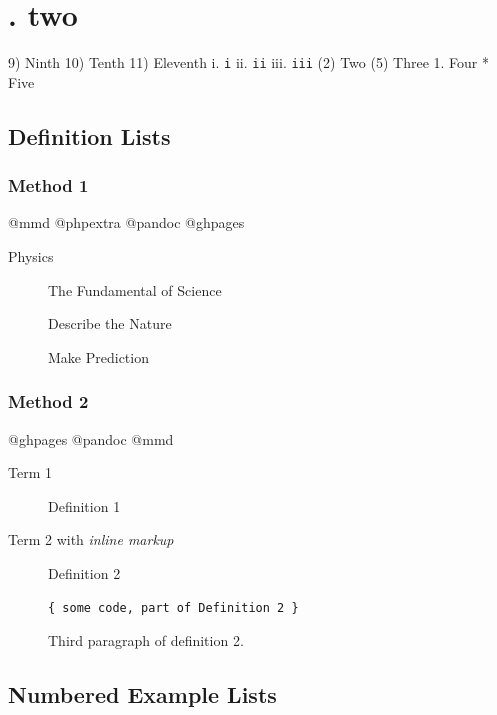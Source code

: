 \chapter{. two}
\label{.two}

9) Ninth
10) Tenth
11) Eleventh
 i. \texttt{i}
 ii. \texttt{ii}
 iii. \texttt{iii}
(2) Two
(5) Three
1. Four
* Five

\section{Definition Lists}
\label{definitionlists}

\subsection{Method 1}
\label{method1}

@mmd @phpextra @pandoc @ghpages

\begin{description}

\item[Physics]

The Fundamental of Science

Describe the Nature

Make Prediction
\end{description}

\subsection{Method 2}
\label{method2}

@ghpages @pandoc @mmd

\begin{description}

\item[Term 1]

Definition 1

\item[Term 2 with \emph{inline markup}]

Definition 2

\begin{verbatim}
{ some code, part of Definition 2 }
\end{verbatim}

Third paragraph of definition 2.
\end{description}

\section{Numbered Example Lists}
\label{numberedexamplelists}

